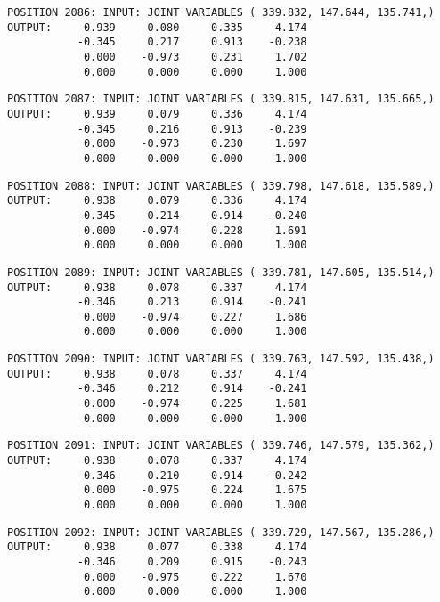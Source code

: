 \begin{verbatim}
POSITION 2086: INPUT: JOINT VARIABLES ( 339.832, 147.644, 135.741,)
OUTPUT:     0.939     0.080     0.335     4.174
           -0.345     0.217     0.913    -0.238
            0.000    -0.973     0.231     1.702
            0.000     0.000     0.000     1.000
\end{verbatim} \pagebreak[1]\begin{verbatim}
POSITION 2087: INPUT: JOINT VARIABLES ( 339.815, 147.631, 135.665,)
OUTPUT:     0.939     0.079     0.336     4.174
           -0.345     0.216     0.913    -0.239
            0.000    -0.973     0.230     1.697
            0.000     0.000     0.000     1.000
\end{verbatim} \pagebreak[1]\begin{verbatim}
POSITION 2088: INPUT: JOINT VARIABLES ( 339.798, 147.618, 135.589,)
OUTPUT:     0.938     0.079     0.336     4.174
           -0.345     0.214     0.914    -0.240
            0.000    -0.974     0.228     1.691
            0.000     0.000     0.000     1.000
\end{verbatim} \pagebreak[1]\begin{verbatim}
POSITION 2089: INPUT: JOINT VARIABLES ( 339.781, 147.605, 135.514,)
OUTPUT:     0.938     0.078     0.337     4.174
           -0.346     0.213     0.914    -0.241
            0.000    -0.974     0.227     1.686
            0.000     0.000     0.000     1.000
\end{verbatim} \pagebreak[1]\begin{verbatim}
POSITION 2090: INPUT: JOINT VARIABLES ( 339.763, 147.592, 135.438,)
OUTPUT:     0.938     0.078     0.337     4.174
           -0.346     0.212     0.914    -0.241
            0.000    -0.974     0.225     1.681
            0.000     0.000     0.000     1.000
\end{verbatim} \pagebreak[1]\begin{verbatim}
POSITION 2091: INPUT: JOINT VARIABLES ( 339.746, 147.579, 135.362,)
OUTPUT:     0.938     0.078     0.337     4.174
           -0.346     0.210     0.914    -0.242
            0.000    -0.975     0.224     1.675
            0.000     0.000     0.000     1.000
\end{verbatim} \pagebreak[1]\begin{verbatim}
POSITION 2092: INPUT: JOINT VARIABLES ( 339.729, 147.567, 135.286,)
OUTPUT:     0.938     0.077     0.338     4.174
           -0.346     0.209     0.915    -0.243
            0.000    -0.975     0.222     1.670
            0.000     0.000     0.000     1.000
\end{verbatim} \pagebreak[1]\begin{verbatim}

\end{verbatim}
